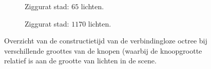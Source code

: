 \begin{figure}[p]
\begin{adjustbox}{minipage=\textwidth, scale=0.6}
\begin{subfigure}[b]{0.83\textwidth}
      \caption{Ziggurat stad: $65$ lichten.}
      \label{fig:hs-nodesize-construction-time::zc-low}
    \end{subfigure}
  \end{adjustbox} %
  \begin{adjustbox}{minipage=\textwidth, scale=0.6}
    \begin{subfigure}[b]{0.83\textwidth}
      \centering
      \def\svgwidth{\textwidth}
      
      \caption{Ziggurat stad: $1170$ lichten.}
      \label{fig:hs-nodesize-construction-time::zc-high}
    \end{subfigure}
  \end{adjustbox}
  \caption{Overzicht van de constructietijd van de verbindingloze octree
           bij verschillende groottes van de knopen (waarbij de knoopgrootte
           relatief is aan de grootte van lichten in de scene.}
  \label{fig:hs-nodesize-construction-time}
\end{figure}

